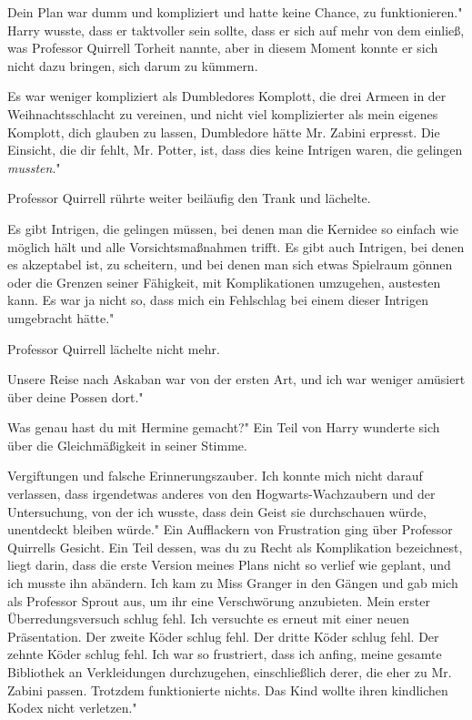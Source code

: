 \glqq{}Dein Plan war dumm und kompliziert und hatte keine Chance, zu
funktionieren." Harry wusste, dass er taktvoller sein sollte, dass er sich auf
mehr von dem einließ, was Professor Quirrell Torheit nannte, aber in diesem
Moment konnte er sich nicht dazu bringen, sich darum zu kümmern.

\glqq{}Es war weniger kompliziert als Dumbledores Komplott, die drei Armeen in
der Weihnachtsschlacht zu vereinen, und nicht viel komplizierter als mein
eigenes Komplott, dich glauben zu lassen, Dumbledore hätte Mr. Zabini erpresst.
Die Einsicht, die dir fehlt, Mr. Potter, ist, dass dies keine Intrigen waren,
die gelingen \emph{mussten}."

Professor Quirrell rührte weiter beiläufig den Trank und lächelte.

\glqq{}Es gibt Intrigen, die gelingen müssen, bei denen man die Kernidee so
einfach wie möglich hält und alle Vorsichtsmaßnahmen trifft. Es gibt auch
Intrigen, bei denen es akzeptabel ist, zu scheitern, und bei denen man sich
etwas Spielraum gönnen oder die Grenzen seiner Fähigkeit, mit Komplikationen
umzugehen, austesten kann. Es war ja nicht so, dass mich ein Fehlschlag bei
einem dieser Intrigen umgebracht hätte."

Professor Quirrell lächelte nicht mehr.

\glqq{}Unsere Reise nach Askaban war von der ersten Art, und ich war weniger
amüsiert über deine Possen dort."

\glqq{}Was genau hast du mit Hermine gemacht?" Ein Teil von Harry wunderte sich
über die Gleichmäßigkeit in seiner Stimme.

\glqq{}Vergiftungen und falsche Erinnerungszauber. Ich konnte mich nicht darauf
verlassen, dass irgendetwas anderes von den Hogwarts-Wachzaubern und der
Untersuchung, von der ich wusste, dass dein Geist sie durchschauen würde,
unentdeckt bleiben würde." Ein Aufflackern von Frustration ging über Professor
Quirrells Gesicht. \glqq{}Ein Teil dessen, was du zu Recht als Komplikation
bezeichnest, liegt darin, dass die erste Version meines Plans nicht so verlief
wie geplant, und ich musste ihn abändern. Ich kam zu Miss Granger in den Gängen
und gab mich als Professor Sprout aus, um ihr eine Verschwörung anzubieten. Mein
erster Überredungsversuch schlug fehl. Ich versuchte es erneut mit einer neuen
Präsentation. Der zweite Köder schlug fehl. Der dritte Köder schlug fehl. Der
zehnte Köder schlug fehl. Ich war so frustriert, dass ich anfing, meine gesamte
Bibliothek an Verkleidungen durchzugehen, einschließlich derer, die eher zu Mr.
Zabini passen. Trotzdem funktionierte nichts. Das Kind wollte ihren kindlichen
Kodex nicht verletzen."

